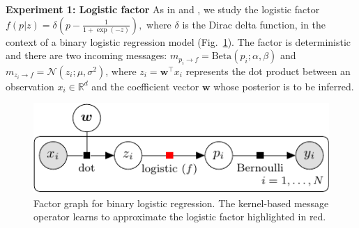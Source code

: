 \documentclass[english]{article}
\theoremstyle{plain}
\theoremstyle{plain}
\newcommand{\factor}{f}				%
\newcommand{\msg}[2]{m_{#1 \rightarrow #2}}			%
\newcommand{\figref}[1]{Fig.~\ref{#1}}
\begin{document}



\textbf{Experiment 1: Logistic factor}
As in \citet{Heess2013} and \citet{Eslami2014}, we study the logistic factor 
$\factor(p|z)=\delta\left(p-\frac{1}{1+\exp(-z)}\right),$ 
%
%
where $\delta$ is the Dirac delta function, in the context of 
a binary logistic regression model  (\figref{fig:factor_graph_binlog}).
The factor is deterministic and there are two incoming messages: 
$\msg{p_i}{\factor} = \text{Beta}(p_i; \alpha, \beta) $ and 
$\msg{z_i}{\factor} = \mathcal{N}(z_i; \mu, \sigma^2)$, 
where $z_i = \boldsymbol{w}^\top x_i$ represents the dot product between an observation 
$x_i \in \mathbb{R}^d$ and the coefficient vector $\boldsymbol{w}$ whose posterior is 
to be inferred.


\begin{figure}[ht]
\centering
\includegraphics[width=0.8\columnwidth]{binary_logistic_regression-crop}
%  
%  
\caption{Factor graph for binary logistic regression. 
The kernel-based message operator learns to approximate the logistic factor 
highlighted in red. 
}
\label{fig:factor_graph_binlog}
\end{figure}
\end{document}
